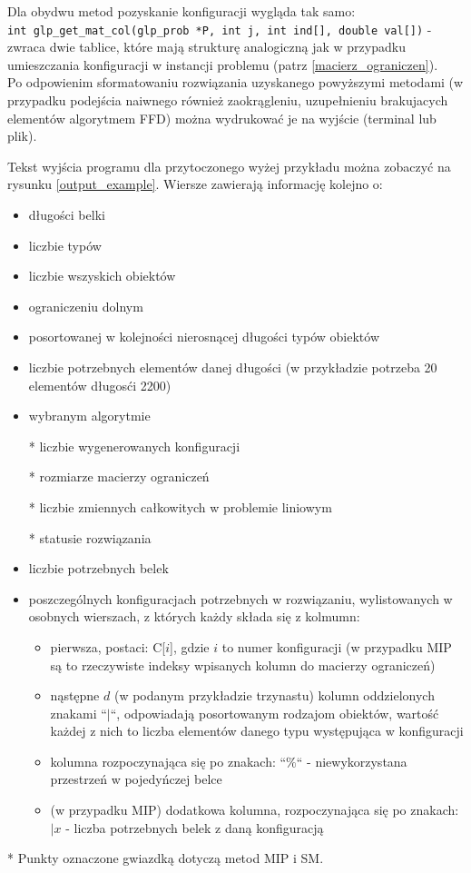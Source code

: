 Dla obydwu metod pozyskanie konfiguracji wygląda tak samo: \\
\verb|int glp_get_mat_col(glp_prob *P, int j, int ind[], double val[])| - zwraca dwie tablice, które mają strukturę analogiczną jak w przypadku umieszczania konfiguracji w instancji problemu (patrz \ref{macierz_ograniczen}). \\


Po odpowienim sformatowaniu rozwiązania uzyskanego powyższymi metodami (w przypadku podejścia naiwnego również zaokrągleniu, uzupełnieniu brakujacych elementów algorytmem FFD) można wydrukować je na wyjście (terminal lub plik).

Tekst wyjścia programu dla przytoczonego wyżej przykładu można zobaczyć na rysunku \ref{output_example}. 
Wiersze zawierają informację kolejno o: 
\begin{itemize}
	\item długości belki
	\item liczbie typów
	\item liczbie wszyskich obiektów
	\item ograniczeniu dolnym
	\item posortowanej w kolejności nierosnącej długości typów obiektów
	\item liczbie potrzebnych elementów danej długości (w przykładzie potrzeba 20 elementów długosći 2200)
	\item wybranym algorytmie
	\item[*] liczbie wygenerowanych konfiguracji
	\item[*] rozmiarze macierzy ograniczeń
	\item[*] liczbie zmiennych całkowitych w problemie liniowym
	\item[*] statusie rozwiązania
	\item liczbie potrzebnych belek
	\item poszczególnych konfiguracjach potrzebnych w rozwiązaniu, wylistowanych w osobnych wierszach, z których każdy składa się z kolmumn:
	\begin{itemize}
		\item  pierwsza, postaci: C[$i$], gdzie $i$ to numer konfiguracji (w przypadku MIP są to rzeczywiste indeksy wpisanych kolumn do macierzy ograniczeń)
		\item nąstępne $d$ (w podanym przykładzie trzynastu) kolumn oddzielonych znakami ``$|$``, odpowiadają posortowanym rodzajom obiektów, wartość każdej z nich to liczba elementów danego typu występująca w konfiguracji
		\item kolumna rozpoczynająca się po znakach: ``$\%$`` - niewykorzystana przestrzeń w pojedyńczej belce
		\item (w przypadku MIP) dodatkowa kolumna, rozpoczynająca się po znakach: $|x$ - liczba potrzebnych belek z daną konfiguracją
	\end{itemize}
\end{itemize}
* Punkty oznaczone gwiazdką dotyczą metod MIP i SM.

